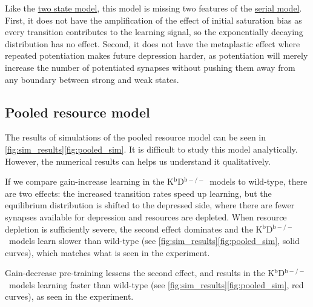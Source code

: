 \documentclass[10pt]{article}
\newcommand{\KO}{K$^\mathrm{b}$D$^{\mathrm{b}-/-}$}
\begin{document}
Like the \hyperref[sec:binary]{two state model}, this model is missing two features of the \hyperref[sec:multistate]{serial model}.
First, it does not have the amplification of the effect of initial saturation bias as every transition contributes to the learning signal, so the exponentially decaying distribution has no effect.
Second, it does not have the metaplastic effect where repeated potentiation makes future depression harder, as potentiation will merely increase the number of potentiated synapses without pushing them away from any boundary between strong and weak states.



\subsection{Pooled resource model}\label{sec:pooled}
%
%
%
%


The results of simulations of the pooled resource model can be seen in
\autoref{fig:sim_results}\ref{fig:pooled_sim}. %
It is difficult to study this model analytically.
However, the numerical results can helps us understand it qualitatively.

If we compare gain-increase learning in the \KO\ models to wild-type, there are two effects: the increased transition rates speed up learning, but the equilibrium distribution is shifted to the depressed side,
where there are fewer synapses available for depression and resources are depleted.
When resource depletion is sufficiently severe, the second effect dominates and the \KO\ models learn slower than wild-type (see \autoref{fig:sim_results}\ref{fig:pooled_sim}, %
solid curves), which matches what is seen in the experiment.

Gain-decrease pre-training lessens the second effect, and results in the \KO\ models learning faster than wild-type (see \autoref{fig:sim_results}\ref{fig:pooled_sim}, %
red curves),
as seen in the experiment.
\end{document}
